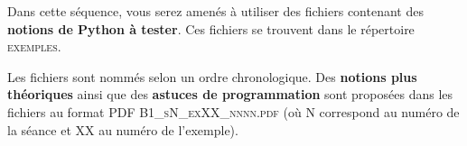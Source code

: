 

Dans cette séquence, vous serez amenés à utiliser des fichiers contenant des \textbf{notions de Python à tester}. Ces fichiers se trouvent dans le répertoire \mbox{\textsc{exemples}}.

\medskip

Les fichiers sont nommés selon un ordre chronologique. Des \textbf{notions plus théoriques} ainsi que des \textbf{astuces de programmation}
 sont proposées dans les fichiers au format PDF \mbox{\textsc{B1\_sN\_exXX\_nnnn.pdf}} (où N correspond au numéro de la séance et XX au numéro de l'exemple).


